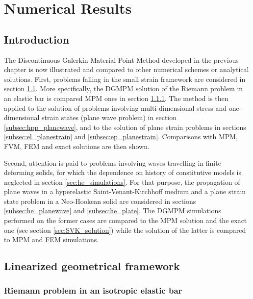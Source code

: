 \chapter{Numerical Results}
\section*{Introduction}
The Discontinuous Galerkin Material Point Method developed in the previous chapter is now illustrated and compared to other numerical schemes or analytical solutions. 
First, problems falling in the small strain framework are considered in section \ref{sec:hpp_simulations}. More specifically, the DGMPM solution of the Riemann problem in an elastic bar is compared MPM ones in section \ref{subsec:hpp_bar}. The method is then applied to the solution of problems involving multi-dimensional stress and one-dimensional strain states (plane wave problem) in section \ref{subsec:hpp_planewave}, and to the solution of plane strain problems in sections \ref{subsec:el_planestrain} and \ref{subsec:ep_planestrain}. Comparisons with MPM, FVM, FEM and exact solutions are then shown.

Second, attention is paid to problems involving waves travelling in finite deforming solids, for which the dependence on history of constitutive models is neglected in section \ref{sec:he_simulations}. For that purpose, the propagation of plane waves in a hyperelastic Saint-Venant-Kirchhoff medium and a plane strain state problem in a Neo-Hookean solid are considered in sections \ref{subsec:he_planewave} and \ref{subsec:he_plate}. The DGMPM simulations performed on the former cases are compared to the MPM solution and the exact one (see section \ref{sec:SVK_solution}) while the solution of the latter is compared to MPM and FEM simulations.


\section{Linearized geometrical framework}
\label{sec:hpp_simulations}

\subsection{Riemann problem in an isotropic elastic bar}
\label{subsec:hpp_bar}



